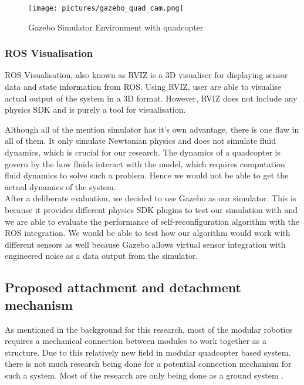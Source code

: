 \documentclass[12pt,A4]{article}
\begin{document}
	\begin{figure}[h!]
		\centering
		\texttt{[image: pictures/gazebo\_quad\_cam.png]}
		\caption{Gazebo Simulator Environment with quadcopter}
	\end{figure}
	
	\subsubsection{ROS Visualisation}
	\hfill\begin{minipage}{\dimexpr\textwidth-1cm}
	ROS Visualisation, also known as RVIZ is a 3D visualiser for displaying sensor data and state information from ROS. Using RVIZ, user are able to visualise actual output of the system in a 3D format. However, RVIZ does not include any physics SDK and is purely a tool for visualisation.\\
	\end{minipage}
	
	Although all of the mention simulator has it's own advantage, there is one flaw in all of them. It only simulate Newtonian physics and does not simulate fluid dynamics, which is crucial for our research. The dynamics of a quadcopter is govern by the how fluids interact with the model, which requires computation fluid dynamics to solve such a problem. Hence we would not be able to get the actual dynamics of the system.\\
	
	After a deliberate evaluation, we decided to use Gazebo as our simulator. This is because it provides different physics SDK plugins to test our simulation with and we are able to evaluate the performance of self-reconfiguration algorithm with the ROS integration. We would be able to test how our algorithm would work with different sensors as well because Gazebo allows virtual sensor integration with engineered noise as a data output from the simulator.\\
	
	\subsection{Proposed attachment and detachment mechanism}
	
	As mentioned in the background for this research, most of the modular robotics requires a mechanical connection between modules to work together as a structure. Due to this relatively new field in modular quadcopter based system. there is not much research being done for a potential connection mechanism for such a system. Most of the research are only being done as a ground system \citep{yim2007modular}. \\
	
\end{document}

